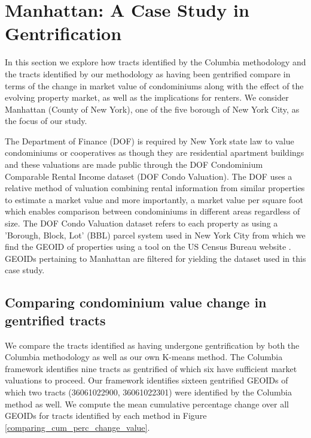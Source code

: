 
\section{Manhattan: A Case Study in Gentrification}\label{case_study}

In this section we explore how tracts identified by the Columbia methodology and the tracts identified by our methodology as having been gentrified compare in terms of the change in market value of condominiums along with the effect of the evolving property market, as well as the implications for renters. We consider Manhattan (County of New York), one of the five borough of New York City, as the focus of our study. 

The Department of Finance (DOF) is required by New York state law to value condominiums or cooperatives as though they are residential apartment buildings and these valuations are made public through the DOF Condominium Comparable Rental Income dataset \cite{DOF Condo Valuation dataset} (DOF Condo Valuation). The DOF uses a relative method of valuation combining rental information from similar properties to estimate a market value and more importantly, a market value per square foot which enables comparison between condominiums in different areas regardless of size. The DOF Condo Valuation dataset refers to each property as using a 'Borough, Block, Lot' \cite{BBL info} (BBL) parcel system used in New York City from which we find the GEOID of properties using a tool on the US Census Bureau website \cite{BBL to GEOID conversion}. GEOIDs pertaining to Manhattan are filtered for yielding the dataset used in this case study.

\subsection{Comparing condominium value change in gentrified tracts}
\label{finding excess relative change}

We compare the tracts identified as having undergone gentrification by both the Columbia methodology as well as our own K-means method. The Columbia framework identifies nine tracts as gentrified of which six have sufficient market valuations to proceed. Our framework identifies sixteen gentrified GEOIDs of which two tracts (36061022900, 36061022301) were identified by the Columbia method as well. We compute the mean cumulative percentage change over all GEOIDs for tracts identified by each method in Figure \ref{comparing_cum_perc_change_value}.

